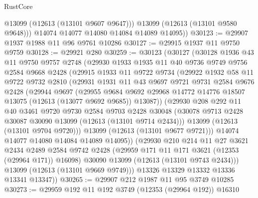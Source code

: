 \begin{lexlean}{RustCore}
\begin{coremodule}
            @13099
            (@12613 (@13101 @9607 @9647)))
          @13099
          (@12613 (@13101 @9580 @9648)))
        @14074
        @14077
        @14080
        @14084
        @14089
        @14095))
@30123 := @29907 @1937 @1988 @11 @96 @9761 @10286
@30127 := @29915 @1937 @11 @9750 @9759
@30128 := @29921 @280
@30259 := @30123
    (@30127
      (@30128
        @1936
        @43
        @11
        @9750
        @9757
        @2748
        (@29930
          @1933
          @1935
          @11
          @40
          @9736
          @9749
          @9756
          @2584
          @9668
          @2428
          (@29915
            @1933
            @11
            @9722
            @9734
            (@29922
              @1932
              @58
              @11
              @9722
              @9732
              @2810
              (@29931
                @1931
                @11
                @43
                @9697
                @9721
                @9731
                @2584
                @9676
                @2428
                (@29944
                  @9697
                  (@29955
                    @9684
                    @9692
                    @29968
                    @14772
                    @14776
                    @18507
                    @13075
                    (@12613 (@13077 @9692 @9685))
                    @13087))
                (@29930
                  @208
                  @292
                  @11
                  @40
                  @3461
                  @9720
                  @9730
                  @2584
                  @9703
                  @2428
                  @30048
                  (@30078 @9713 @2428 @30087 @30090 @13099 (@12613 (@13101 @9714 @2434)))
                  @13099
                  (@12613 (@13101 @9704 @9720)))
                @13099
                (@12613 (@13101 @9677 @9721)))
              @14074
              @14077
              @14080
              @14084
              @14089
              @14095))
          (@29930
            @210
            @214
            @11
            @27
            @3621
            @2434
            @2489
            @2584
            @9742
            @2428
            (@29959 @171 @11 @171 @3621 (@12353 (@29964 @171)) @16098)
            @30090
            @13099
            (@12613 (@13101 @9743 @2434)))
          @13099
          (@12613 (@13101 @9669 @9749)))
        @13326
        @13329
        @13332
        @13336
        @13341
        @13347))
@30265 := @29907 @212 @1987 @11 @95 @3749 @10285
@30273 := @29959 @192 @11 @192 @3749 (@12353 (@29964 @192)) @16310

\end{coremodule}
\end{lexlean}
